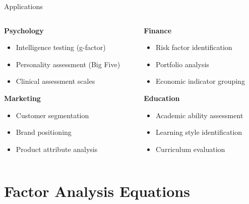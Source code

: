 \documentclass[aspectratio=169]{beamer}
\begin{document}
\begin{frame}{Applications}
  \begin{columns}
    \begin{column}{0.5\textwidth}
      \textbf{Psychology}
      \begin{itemize}
        \item Intelligence testing (g-factor)
        \item Personality assessment (Big Five)
        \item Clinical assessment scales
      \end{itemize}
      
      \textbf{Marketing}
      \begin{itemize}
        \item Customer segmentation
        \item Brand positioning
        \item Product attribute analysis
      \end{itemize}
    \end{column}
    \begin{column}{0.5\textwidth}
      \textbf{Finance}
      \begin{itemize}
        \item Risk factor identification
        \item Portfolio analysis
        \item Economic indicator grouping
      \end{itemize}
      
      \textbf{Education}
      \begin{itemize}
        \item Academic ability assessment
        \item Learning style identification
        \item Curriculum evaluation
      \end{itemize}
    \end{column}
  \end{columns}
\end{frame}


\section{Factor Analysis Equations}
\begin{frame}
  \sectionpage
\end{frame}
\end{document}
